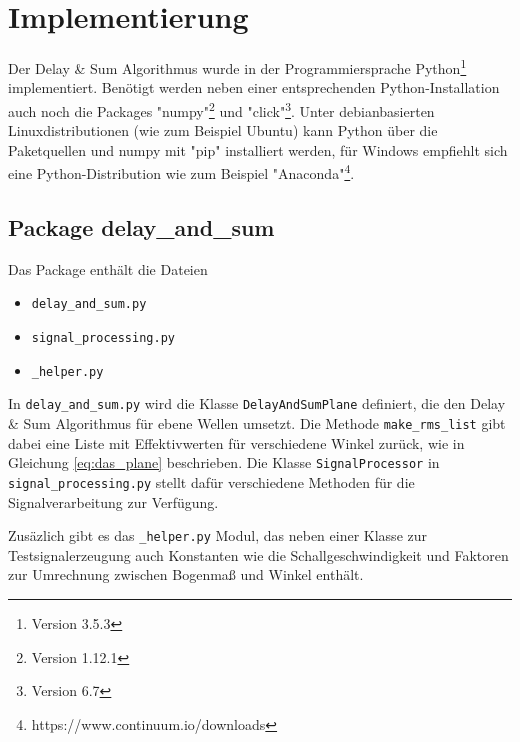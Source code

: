 \section{Implementierung}
	
	Der Delay \& Sum Algorithmus wurde in der Programmiersprache Python\footnote{Version 3.5.3} implementiert. Benötigt werden neben einer entsprechenden Python-Installation auch noch die Packages "numpy"\footnote{Version 1.12.1} und "click"\footnote{Version 6.7}. Unter debianbasierten Linuxdistributionen (wie zum Beispiel Ubuntu) kann Python über die Paketquellen und numpy mit "pip" installiert werden, für Windows empfiehlt sich eine Python-Distribution wie zum Beispiel "Anaconda"\footnote{https://www.continuum.io/downloads}.
	
	\subsection{Package delay\_and\_sum}
	
	Das Package enthält die Dateien
	\begin{itemize}
		\item \texttt{delay\_and\_sum.py}
		\item \texttt{signal\_processing.py}
		\item \texttt{\_helper.py}
	\end{itemize}
	In \texttt{delay\_and\_sum.py} wird die Klasse \texttt{DelayAndSumPlane} definiert, die den Delay \& Sum Algorithmus für ebene Wellen umsetzt. Die Methode \texttt{make\_rms\_list} gibt dabei eine Liste mit Effektivwerten für verschiedene Winkel zurück, wie in Gleichung \ref{eq:das_plane} beschrieben.
	Die Klasse \texttt{SignalProcessor} in \texttt{signal\_processing.py} stellt dafür verschiedene Methoden für die Signalverarbeitung zur Verfügung.
	
	Zusäzlich gibt es das \texttt{\_helper.py} Modul, das neben einer Klasse zur Testsignalerzeugung auch Konstanten wie die Schallgeschwindigkeit und Faktoren zur Umrechnung zwischen Bogenmaß und Winkel enthält.